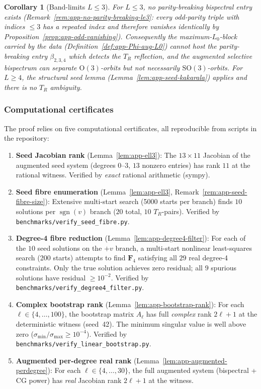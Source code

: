 \documentclass{article}
\newtheorem{corollary}[theorem]{Corollary}
\theoremstyle{definition}
\theoremstyle{remark}
\DeclareMathOperator{\sgn}{sgn}
\newcommand{\SO}{\mathrm{SO}}
\newcommand{\OG}{\mathrm{O}}
\theoremstyle{definition}
\begin{document}
\begin{corollary}[Band-limits $L \le 3$]
For $L \le 3$, no parity-breaking bispectral entry exists
(Remark~\ref{rem:app-no-parity-breaking-le3}: every odd-parity triple
with indices $\le 3$ has a repeated index and therefore vanishes
identically by Proposition~\ref{prop:app-odd-vanishing}).
Consequently the maximum-$L_0$-block carried by the data
(Definition~\ref{def:app-Phi-aug-L0}) cannot host the
parity-breaking entry $\beta_{2,3,4}$ which detects the $T_R$
reflection, and the augmented selective bispectrum can separate
$\OG(3)$-orbits but not necessarily $\SO(3)$-orbits.
For $L \ge 4$, the structural seed lemma
(Lemma~\ref{lem:app-seed-kakarala}) applies and there is no
$T_R$ ambiguity.
\end{corollary}

\subsubsection{Computational certificates}

The proof relies on five computational certificates, all reproducible
from scripts in the repository:
\begin{enumerate}[nosep]
\item \textbf{Seed Jacobian rank} (Lemma~\ref{lem:app-ell3}):
  The $13 \times 11$ Jacobian of the augmented seed system
  (degrees $0$--$3$, $13$ nonzero entries) has rank $11$ at the rational
  witness.
  Verified by \emph{exact} rational arithmetic (sympy).

\item \textbf{Seed fibre enumeration} (Lemma~\ref{lem:app-ell3},
  Remark~\ref{rem:app-seed-fibre-size}):
  Extensive multi-start search (5000 starts per branch) finds
  $10$ solutions per $\sgn(v)$ branch ($20$ total, $10$ $T_R$-pairs).
  Verified by \texttt{benchmarks/verify\_seed\_fibre.py}.

\item \textbf{Degree-4 fibre reduction}
  (Lemma~\ref{lem:app-degree4-filter}):
  For each of the $10$ seed solutions on the $+v$ branch, a
  multi-start nonlinear least-squares search (200 starts) attempts to
  find $\mathbf{F}_4$ satisfying all $29$ real degree-4 constraints.
  Only the true solution achieves zero residual; all $9$ spurious
  solutions have residual $\ge 10^{-2}$.
  Verified by \texttt{benchmarks/verify\_degree4\_filter.py}.

\item \textbf{Complex bootstrap rank} (Lemma~\ref{lem:app-bootstrap-rank}):
  For each $\ell \in \{4, \ldots, 100\}$, the bootstrap matrix $A_\ell$
  has full \emph{complex} rank $2\ell+1$ at the deterministic witness
  (seed~42).  The minimum singular value is well above zero
  ($\sigma_{\min} / \sigma_{\max} \ge 10^{-4}$).
  Verified by \texttt{benchmarks/verify\_linear\_bootstrap.py}.

\item \textbf{Augmented per-degree real rank}
  (Lemma~\ref{lem:app-augmented-perdegree}):
  For each $\ell \in \{4, \ldots, 30\}$, the full augmented system
  (bispectral + CG power) has \emph{real} Jacobian rank $2\ell+1$
  at the witness.
\end{enumerate}
\end{document}
